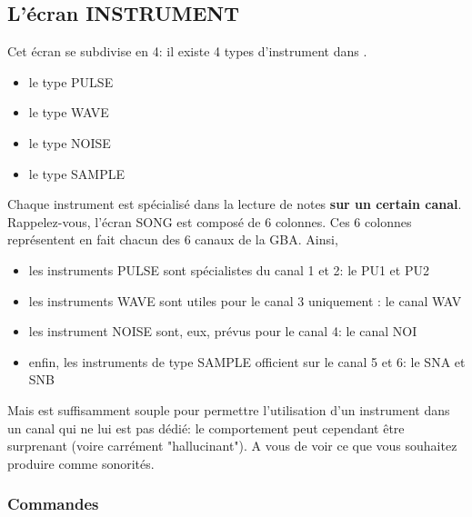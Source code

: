 \documentclass[12pt,a4paper]{article}
\begin{document}
    \subsection{L'écran INSTRUMENT}
    
    Cet écran se subdivise en 4: il existe 4 types d'instrument dans \FAT.\medskip
    
    \begin{itemize}
        \item{le type PULSE}
        \item{le type WAVE}
        \item{le type NOISE}
        \item{le type SAMPLE}
    \end{itemize}\medskip
    
     
     Chaque instrument est spécialisé dans la lecture de notes {\bf sur un certain canal}. Rappelez-vous, l'écran SONG est composé de 6 colonnes. Ces 6 colonnes représentent en fait chacun des 6 canaux de la GBA. Ainsi, 
     
     \begin{itemize}
        \item{les instruments PULSE sont spécialistes du canal 1 et 2: le PU1 et PU2}
        \item{les instruments WAVE sont utiles pour le canal 3 uniquement : le canal WAV}
        \item{les instrument NOISE sont, eux, prévus pour le canal 4: le canal NOI}
        \item{enfin, les instruments de type SAMPLE officient sur le canal 5 et 6: le SNA et SNB}
     \end{itemize}\medskip
     
     Mais \FAT est suffisamment souple pour permettre l'utilisation d'un instrument dans un canal qui ne lui est pas dédié: le comportement peut cependant être surprenant (voire carrément "hallucinant"). A vous de voir ce que vous souhaitez produire comme sonorités.

        \subsubsection{Commandes}
        
\end{document}

